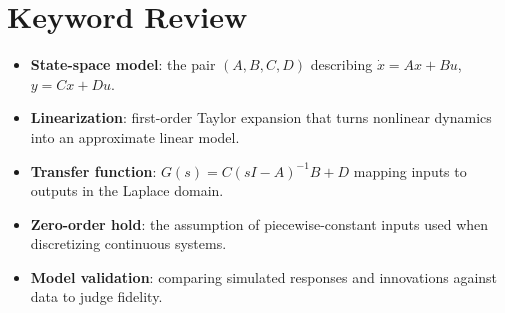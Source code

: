 \section{Keyword Review}
\begin{vocabulary}
\begin{itemize}[leftmargin=*]
    \item \textbf{State-space model}: the pair $(A, B, C, D)$ describing $\dot{x} = A x + B u$, $y = C x + D u$.
    \item \textbf{Linearization}: first-order Taylor expansion that turns nonlinear dynamics into an approximate linear model.
    \item \textbf{Transfer function}: $G(s) = C (s I - A)^{-1} B + D$ mapping inputs to outputs in the Laplace domain.
    \item \textbf{Zero-order hold}: the assumption of piecewise-constant inputs used when discretizing continuous systems.
    \item \textbf{Model validation}: comparing simulated responses and innovations against data to judge fidelity.
\end{itemize}
\end{vocabulary}
